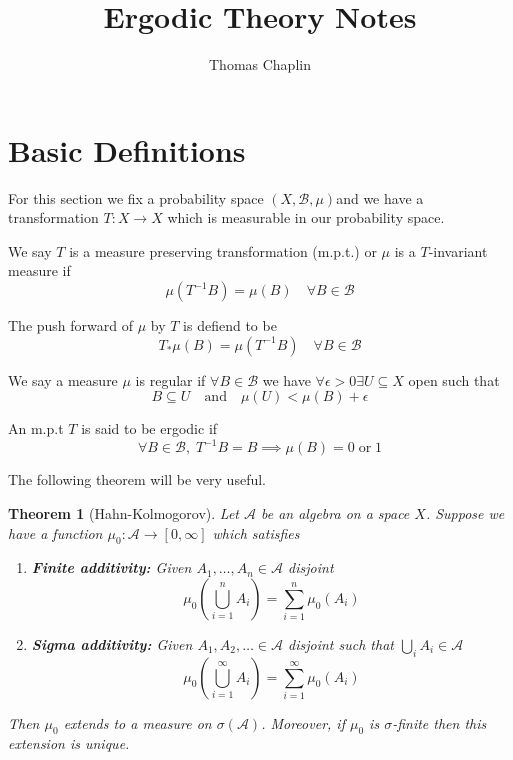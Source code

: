 \documentclass[11pt]{article}
\title{Ergodic Theory Notes}
\author{Thomas Chaplin}
\date{}
\newcommand{\msrspc}{\ensuremath{(X,\mathcal{B},\mu)}}
\newenvironment{defin}
	{\begin{mdframed}[backgroundcolor=white, roundcorner=5pt, linewidth=1pt]}
	{\end{mdframed}}
\newcommand{\mdf}[1]{{\color{red} #1}}
\newtheorem{theorem}[prop]{Theorem}
\begin{document}
\maketitle
\tableofcontents
\newpage

\section{Basic Definitions}

For this section we fix a probability space \msrspc and we have a transformation $T:X\to X$ which is measurable in our probability space.

\begin{defin}
	
We say $T$ is a \mdf{measure preserving transformation (m.p.t.)} or $\mu$ is a \mdf{$T$-invariant measure} if 
$$\mu(T^{-1}B)=\mu(B)\quad\forall B\in\mathcal{B}$$

The \mdf{push forward of $\mu$ by $T$} is defiend to be
	$$T_*\mu(B)=\mu(T^{-1}B)\quad\forall B \in\mathcal{B}$$

We say a measure $\mu$ is \mdf{regular} if $\forall B\in\mathcal{B}$ we have $\forall\epsilon >0 \exists U\subseteq X$ open such that
$$B\subseteq U \quad \text{and} \quad \mu(U) < \mu(B) + \epsilon$$

An m.p.t $T$ is said to be \mdf{ergodic} if
$$\forall B\in\mathcal{B},\; T^{-1}B=B \implies \mu(B)=0\;\text{or}\;1$$

\end{defin}

The following theorem will be very useful.

\begin{theorem}[Hahn-Kolmogorov]
Let $\mathcal{A}$ be an algebra on a space $X$.
Suppose we have a function $\mu_0:\mathcal{A}\to [0, \infty]$ which satisfies
\begin{enumerate}[label=(\roman*)]
	\item \textbf{Finite additivity: }Given $A_1, \dots, A_n\in\mathcal{A}$ disjoint
		\[
			\mu_0\left( \bigcup_{i=1}^n A_i\right)=\sum_{i=1}^{n}\mu_0(A_i)
		\]
	\item \textbf{Sigma additivity: }Given $A_1, A_2, \dots \in \mathcal{A}$ disjoint such that $\bigcup_i A_i\in\mathcal{A}$
		\[
			\mu_0\left( \bigcup_{i=1}^\infty A_i \right) = \sum_{i=1}^{\infty}\mu_0(A_i)
		\]
\end{enumerate}
Then $\mu_0$ extends to a measure on $\sigma(\mathcal{A})$.
Moreover, if $\mu_0$ is $\sigma$-finite then this extension is unique.
\end{theorem}
\end{document}
